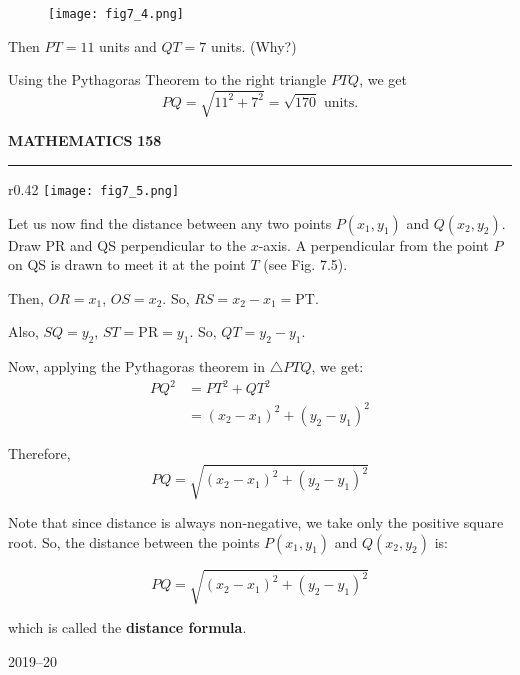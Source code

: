 \documentclass[11pt]{article}
\begin{document}
\vspace{1.5em}

\begin{figure}[H]
    \centering
    \texttt{[image: fig7\_4.png]}
\end{figure}

Then \(PT = 11\) units and \(QT = 7\) units. (Why?)

Using the Pythagoras Theorem to the right triangle \(PTQ\), we get
\[
PQ = \sqrt{11^2 + 7^2} = \sqrt{170} \text{ units}.
\]




\vspace{3em}

{\color{ncertblue}\textbf{MATHEMATICS}} \hfill \textbf{158}

{\color{ncertblue}\noindent\rule{\textwidth}{0.5pt}}

\vspace{0.5em}

\begin{wrapfigure}{r}{0.42\textwidth}
    \centering
    \vspace{-1em}
    \texttt{[image: fig7\_5.png]}
    \vspace{-1em}
\end{wrapfigure}

\hspace{2em} Let us now find the distance between any two points \(P(x_1, y_1)\) and \(Q(x_2, y_2)\). Draw PR and QS perpendicular to the \(x\)-axis. A perpendicular from the point \(P\) on QS is drawn to meet it at the point \(T\) (see Fig. 7.5).

Then, \(OR = x_1\), \(OS = x_2\). So, \(RS = x_2 - x_1 = \text{PT}\).

Also, \(SQ = y_2\), \(ST = \text{PR} = y_1\). So, \(QT = y_2 - y_1\).

Now, applying the Pythagoras theorem in \(\triangle PTQ\), we get:
\[
\begin{aligned}
PQ^2 &= PT^2 + QT^2 \\
     &= (x_2 - x_1)^2 + (y_2 - y_1)^2
\end{aligned}
\]

Therefore,
\[
PQ = \sqrt{(x_2 - x_1)^2 + (y_2 - y_1)^2}
\]

Note that since distance is always non-negative, we take only the positive square root. So, the distance between the points \(P(x_1, y_1)\) and \(Q(x_2, y_2)\) is:

{\boldmath
\[
PQ = \sqrt{(x_2 - x_1)^2 + (y_2 - y_1)^2}
\]
}

which is called the \textbf{distance formula}.

\vspace{33em}
\begin{center}
    2019--20
\end{center}
\end{document}

